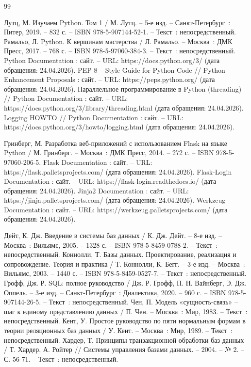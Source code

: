 
\begin{thebibliography}{99}
	
	 Лутц, М. Изучаем Python. Том 1 / М. Лутц. -- 5-е изд. -- Санкт-Петербург~: Питер, 2019. -- 832 с. -- ISBN 978-5-907144-52-1. -- Текст~: непосредственный.
	 Рамальо, Л. Python. К вершинам мастерства / Л. Рамальо. -- Москва~: ДМК Пресс, 2017. -- 768 с. -- ISBN 978-5-97060-384-3. -- Текст~: непосредственный.
	 Python Documentation : сайт. -- URL: https://docs.python.org/3/ (дата обращения: 24.04.2026). 
	 PEP 8 -- Style Guide for Python Code // Python Enhancement Proposals : сайт. -- URL: https://peps.python.org/ (дата обращения: 24.04.2026).
	 Параллельное программирование в Python (threading) // Python Documentation : сайт. -- URL: https://docs.python.org/3/library/threading.html (дата обращения: 24.04.2026). 
	 Logging HOWTO // Python Documentation : сайт. -- URL: https://docs.python.org/3/howto/logging.html (дата обращения: 24.04.2026).
	
	 Гринберг, М. Разработка веб-приложений с использованием Flask на языке Python / М. Гринберг. -- Москва~: ДМК Пресс, 2014. -- 272 с. -- ISBN 978-5-97060-206-5.
	 Flask Documentation : сайт. -- URL: https://flask.palletsprojects.com/ (дата обращения: 24.04.2026).
	 Flask-Login Documentation : сайт. -- URL: https://flask-login.readthedocs.io/ (дата обращения: 24.04.2026).
	 Jinja2 Documentation : сайт. -- URL: https://jinja.palletsprojects.com/ (дата обращения: 24.04.2026).
	 Werkzeug Documentation : сайт. -- URL: https://werkzeug.palletsprojects.com/ (дата обращения: 24.04.2026).
	
	 Дейт, К. Дж. Введение в системы баз данных / К. Дж. Дейт. -- 8-е изд. -- Москва~: Вильямс, 2005. -- 1328 с. -- ISBN 978-5-8459-0788-2. -- Текст~: непосредственный.
	 Коннолли, Т. Базы данных. Проектирование, реализация и сопровождение. Теория и практика / Т. Коннолли, К. Бегг. -- 3-е изд. -- Москва~: Вильямс, 2003. -- 1440 с. -- ISBN 978-5-8459-0527-7. -- Текст~: непосредственный.
	 Грофф, Дж. Р. SQL: полное руководство / Дж. Р. Грофф, П. Н. Вайнберг, Э. Дж. Оппель. -- 3-е изд. -- Санкт-Петербург~: Диалектика, 2020. -- 960 с. -- ISBN 978-5-907144-26-5. -- Текст~: непосредственный.
	 Чен, П. Модель «сущность-связь» -- шаг к единому представлению данных / П. Чен. -- Москва~: Мир, 1983. -- Текст~: непосредственный.
	 Кент, У. Простое руководство по пяти нормальным формам в теории реляционных баз данных / У. Кент. -- Москва~: Мир, 1989. -- Текст~: непосредственный.
	 Хардер, Т. Принципы транзакционной обработки баз данных / Т. Хардер, А. Ройтер // Системы управления базами данных. -- 2004. -- № 2. -- С. 56-71. -- Текст~: непосредственный. %
	

\end{thebibliography}
